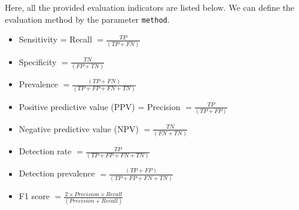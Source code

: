 \documentclass[]{article}
\begin{document}
Here, all the provided evaluation indicators are listed below. We can define the evaluation method by the parameter \texttt{method}.

\begin{itemize}
\item
  Sensitivity = Recall \(= \frac{TP}{(TP + FN)}\)
\item
  Specificity \(= \frac{TN}{(FP + TN)}\)
\item
  Prevalence \(= \frac{(TP + FN)}{(TP + FP + FN + TN)}\)
\item
  Positive predictive value (PPV) = Precision \(= \frac{TP}{(TP + FP)}\)
\item
  Negative predictive value (NPV) \(= \frac{TN}{(FN + TN)}\)
\item
  Detection rate \(= \frac{TP}{(TP + FP + FN + TN)}\)
\item
  Detection prevalence \(= \frac{(TP + FP)}{(TP + FP + FN + TN)}\)
\item
  F1 score \(= \frac{2 \times Precision \times Recall}{(Precision + Recall)}\)
\end{itemize}
\end{document}
